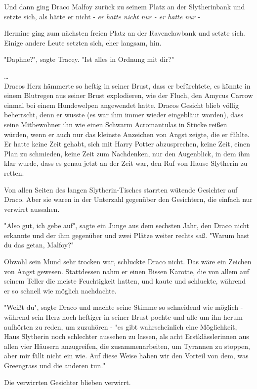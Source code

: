 {Und dann ging Draco Malfoy zurück zu seinem Platz an der Slytherinbank und setzte sich, als hätte er nicht - \emph{er hatte nicht nur - er hatte nur} -

Hermine ging zum nächsten freien Platz an der Ravenclawbank und setzte sich. Einige andere Leute setzten sich, eher langsam, hin.

"Daphne?", sagte Tracey. "Ist alles in Ordnung mit dir?"

…\\ Dracos Herz hämmerte so heftig in seiner Brust, dass er befürchtete, es könnte in einem Blutregen aus seiner Brust explodieren, wie der Fluch, den Amycus Carrow einmal bei einem Hundewelpen angewendet hatte. Dracos Gesicht blieb völlig beherrscht, denn er wusste (es war ihm immer wieder eingebläut worden), dass seine Mitbewohner ihn wie einen Schwarm Acromantulas in Stücke reißen würden, wenn er auch nur das kleinste Anzeichen von Angst zeigte, die er fühlte. Er hatte keine Zeit gehabt, sich mit Harry Potter abzusprechen, keine Zeit, einen Plan zu schmieden, keine Zeit zum Nachdenken, nur den Augenblick, in dem ihm klar wurde, dass es genau jetzt an der Zeit war, den Ruf von Hause Slytherin zu retten.

Von allen Seiten des langen Slytherin-Tisches starrten wütende Gesichter auf Draco. Aber sie waren in der Unterzahl gegenüber den Gesichtern, die einfach nur verwirrt aussahen.

"Also gut, ich gebe auf", sagte ein Junge aus dem sechsten Jahr, den Draco nicht erkannte und der ihm gegenüber und zwei Plätze weiter rechts saß. "Warum hast du das getan, Malfoy?"

Obwohl sein Mund sehr trocken war, schluckte Draco nicht. Das wäre ein Zeichen von Angst gewesen. Stattdessen nahm er einen Bissen Karotte, die von allem auf seinem Teller die meiste Feuchtigkeit hatten, und kaute und schluckte, während er so schnell wie möglich nachdachte.

"Weißt du", sagte Draco und machte seine Stimme so schneidend wie möglich - während sein Herz noch heftiger in seiner Brust pochte und alle um ihn herum aufhörten zu reden, um zuzuhören - "es gibt wahrscheinlich eine Möglichkeit, Haus Slytherin noch schlechter aussehen zu lassen, als acht Erstklässlerinnen aus allen vier Häusern anzugreifen, die zusammenarbeiten, um Tyrannen zu stoppen, aber mir fällt nicht ein wie. Auf diese Weise haben wir den Vorteil von dem, was Greengrass und die anderen tun."

Die verwirrten Gesichter blieben verwirrt.

}

